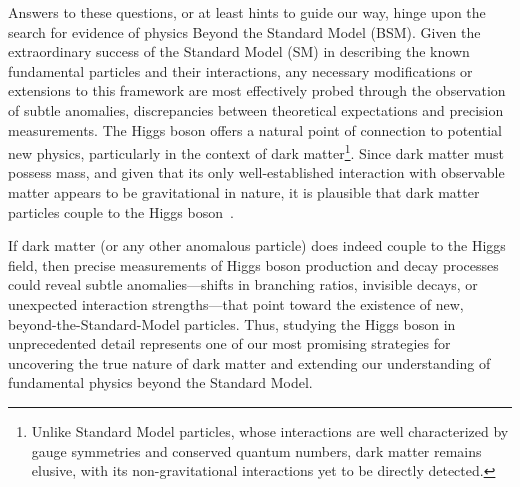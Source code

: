 Answers to these questions, or at least hints to guide our way, hinge upon the search for evidence of physics Beyond the Standard Model (BSM). Given the extraordinary success of the Standard Model (SM) in describing the known fundamental particles and their interactions, any necessary modifications or extensions to this framework are most effectively probed through the observation of subtle anomalies, discrepancies between theoretical expectations and precision measurements. The Higgs boson offers a natural point of connection to potential new physics, particularly in the context of dark matter\footnote{Unlike Standard Model particles, whose interactions are well characterized by gauge symmetries and conserved quantum numbers, dark matter remains elusive, with its non-gravitational interactions yet to be directly detected.}. Since dark matter must possess mass, and given that its only well-established interaction with observable matter appears to be gravitational in nature, it is plausible that dark matter particles couple to the Higgs boson~\cite{CERNandt20}. 

If dark matter (or any other anomalous particle) does indeed couple to the Higgs field, then precise measurements of Higgs boson production and decay processes could reveal subtle anomalies—shifts in branching ratios, invisible decays, or unexpected interaction strengths—that point toward the existence of new, beyond-the-Standard-Model particles. Thus, studying the Higgs boson in unprecedented detail represents one of our most promising strategies for uncovering the true nature of dark matter and extending our understanding of fundamental physics beyond the Standard Model.





